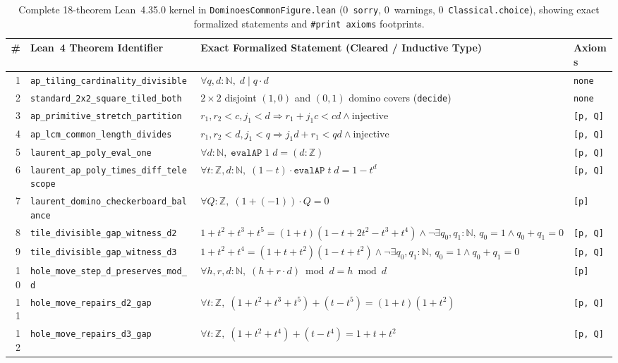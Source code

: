 \documentclass[11pt,twocolumn]{article}
\newcommand{\ZZ}{\mathbb{Z}}
\newcommand{\NN}{\mathbb{N}}
\begin{document}
\begin{table}[t]
\centering
\caption{Complete 18-theorem Lean~4.35.0 kernel in \texttt{DominoesCommonFigure.lean} (0~\texttt{sorry}, 0~warnings, 0~\texttt{Classical.choice}), showing exact formalized statements and \texttt{\#print axioms} footprints.}
\label{tab:lean}
\footnotesize
\setlength{\tabcolsep}{3.5pt}
\begin{tabular}{@{}rlll@{}}
\toprule
\# & Lean~4 Theorem Identifier & Exact Formalized Statement (Cleared / Inductive Type) & Axioms \\
\midrule
1 & \texttt{ap\_tiling\_cardinality\_divisible} & $\forall q, d:\NN,\; d \mid q \cdot d$ & \texttt{none} \\
2 & \texttt{standard\_2x2\_square\_tiled\_both} & $2{\times}2$ disjoint $(1,0)$ and $(0,1)$ domino covers (\texttt{decide}) & \texttt{none} \\
3 & \texttt{ap\_primitive\_stretch\_partition} & $r_1,r_2<c, j_1<d \Rightarrow r_1{+}j_1 c < cd \land \text{injective}$ & \texttt{[p, Q]} \\
4 & \texttt{ap\_lcm\_common\_length\_divides} & $r_1,r_2<d, j_1<q \Rightarrow j_1 d{+}r_1 < qd \land \text{injective}$ & \texttt{[p, Q]} \\
5 & \texttt{laurent\_ap\_poly\_eval\_one} & $\forall d:\NN,\; \texttt{evalAP}\;1\;d = (d:\ZZ)$ & \texttt{[p, Q]} \\
6 & \texttt{laurent\_ap\_poly\_times\_diff\_telescope} & $\forall t:\ZZ, d:\NN,\; (1-t)\cdot \texttt{evalAP}\;t\;d = 1 - t^d$ & \texttt{[p, Q]} \\
7 & \texttt{laurent\_domino\_checkerboard\_balance} & $\forall Q:\ZZ,\; (1 + (-1))\cdot Q = 0$ & \texttt{[p]} \\
8 & \texttt{tile\_divisible\_gap\_witness\_d2} & $1{+}t^2{+}t^3{+}t^5=(1{+}t)(1{-}t{+}2t^2{-}t^3{+}t^4) \land \neg\exists q_0,q_1:\NN,\,q_0{=}1\land q_0{+}q_1{=}0$ & \texttt{[p, Q]} \\
9 & \texttt{tile\_divisible\_gap\_witness\_d3} & $1{+}t^2{+}t^4=(1{+}t{+}t^2)(1{-}t{+}t^2) \land \neg\exists q_0,q_1:\NN,\,q_0{=}1\land q_0{+}q_1{=}0$ & \texttt{[p, Q]} \\
10 & \texttt{hole\_move\_step\_d\_preserves\_mod\_d} & $\forall h,r,d:\NN,\; (h + r\cdot d)\bmod d = h \bmod d$ & \texttt{[p]} \\
11 & \texttt{hole\_move\_repairs\_d2\_gap} & $\forall t:\ZZ,\; (1{+}t^2{+}t^3{+}t^5) + (t - t^5) = (1{+}t)(1{+}t^2)$ & \texttt{[p, Q]} \\
12 & \texttt{hole\_move\_repairs\_d3\_gap} & $\forall t:\ZZ,\; (1{+}t^2{+}t^4) + (t - t^4) = 1{+}t{+}t^2$ & \texttt{[p, Q]} \\

\end{tabular}
\end{table}
\end{document}
